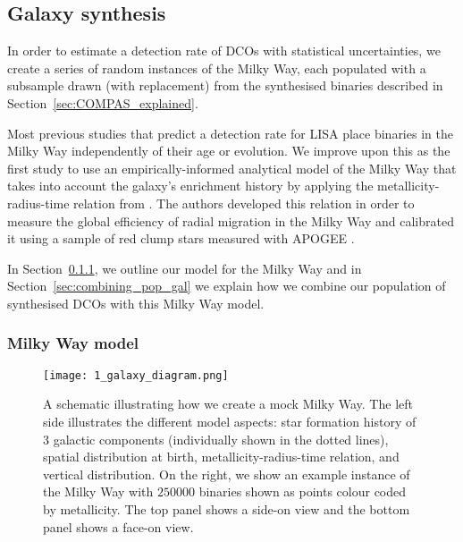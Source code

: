\subsection{Galaxy synthesis}\label{sec:galaxy_synthesis}

In order to estimate a detection rate of DCOs with statistical uncertainties, we create a series of random instances of the Milky Way, each populated with a subsample drawn (with replacement) from the synthesised binaries described in Section~\ref{sec:COMPAS_explained}.

Most previous studies that predict a detection rate for LISA place binaries in the Milky Way independently of their age or evolution. We improve upon this as the first study to use an empirically-informed analytical model of the Milky Way that takes into account the galaxy's enrichment history by applying the metallicity-radius-time relation from \citet{Frankel+2018}. The authors developed this relation in order to measure the global efficiency of radial migration in the Milky Way and calibrated it using a sample of red clump stars measured with APOGEE \citep{Majewski+2017}.

In Section~\ref{sec:mw_model}, we outline our model for the Milky Way and in Section~\ref{sec:combining_pop_gal} we explain how we combine our population of synthesised DCOs with this Milky Way model.

\subsubsection{Milky Way model}\label{sec:mw_model}

\begin{figure*}[t]
    \centering
    \texttt{[image: 1\_galaxy\_diagram.png]}
    \caption{A schematic illustrating how we create a mock Milky Way. The left side illustrates the different model aspects: star formation history of 3 galactic components (individually shown in the dotted lines), spatial distribution at birth, metallicity-radius-time relation, and vertical distribution.
    On the right, we show an example instance of the Milky Way with $250000$ binaries shown as points colour coded by metallicity. The top panel shows a side-on view and the bottom panel shows a face-on view.}
    \label{fig:galaxy_schematic}
\end{figure*}

